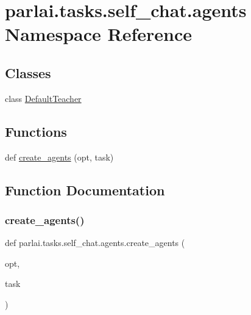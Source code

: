 \hypertarget{namespaceparlai_1_1tasks_1_1self__chat_1_1agents}{}\section{parlai.\+tasks.\+self\+\_\+chat.\+agents Namespace Reference}
\label{namespaceparlai_1_1tasks_1_1self__chat_1_1agents}
\subsection*{Classes}
\begin{DoxyCompactItemize}
\item 
class \hyperlink{classparlai_1_1tasks_1_1self__chat_1_1agents_1_1DefaultTeacher}{Default\+Teacher}
\end{DoxyCompactItemize}
\subsection*{Functions}
\begin{DoxyCompactItemize}
\item 
def \hyperlink{namespaceparlai_1_1tasks_1_1self__chat_1_1agents_a02cc779445cb6c7c9271fd9d193af167}{create\+\_\+agents} (opt, task)
\end{DoxyCompactItemize}


\subsection{Function Documentation}
\mbox{\label{namespaceparlai_1_1tasks_1_1self__chat_1_1agents_a02cc779445cb6c7c9271fd9d193af167}} 
\subsubsection{\texorpdfstring{create\+\_\+agents()}{create\_agents()}}
{\footnotesize\ttfamily def parlai.\+tasks.\+self\+\_\+chat.\+agents.\+create\+\_\+agents (\begin{DoxyParamCaption}\item[{}]{opt,  }\item[{}]{task }\end{DoxyParamCaption})}

